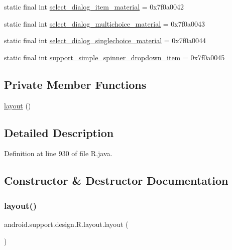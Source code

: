 \begin{DoxyCompactItemize}
static final int \mbox{\hyperlink{classandroid_1_1support_1_1design_1_1_r_1_1layout_aab2090fcba37187805603c08746aa8cc}{select\+\_\+dialog\+\_\+item\+\_\+material}} = 0x7f0a0042
\item 
static final int \mbox{\hyperlink{classandroid_1_1support_1_1design_1_1_r_1_1layout_a3d2eb3f803ab59c599c7022c15479bb8}{select\+\_\+dialog\+\_\+multichoice\+\_\+material}} = 0x7f0a0043
\item 
static final int \mbox{\hyperlink{classandroid_1_1support_1_1design_1_1_r_1_1layout_af908cc6a223fbe33d22bb3088dfc11b2}{select\+\_\+dialog\+\_\+singlechoice\+\_\+material}} = 0x7f0a0044
\item 
static final int \mbox{\hyperlink{classandroid_1_1support_1_1design_1_1_r_1_1layout_a4de293b6e7223138532dd164026cd9c6}{support\+\_\+simple\+\_\+spinner\+\_\+dropdown\+\_\+item}} = 0x7f0a0045
\end{DoxyCompactItemize}
\subsection*{Private Member Functions}
\begin{DoxyCompactItemize}
\item 
\mbox{\hyperlink{classandroid_1_1support_1_1design_1_1_r_1_1layout_a233cc3e001998928e45ff36ce9af8e3e}{layout}} ()
\end{DoxyCompactItemize}


\subsection{Detailed Description}


Definition at line 930 of file R.\+java.



\subsection{Constructor \& Destructor Documentation}
\mbox{\label{classandroid_1_1support_1_1design_1_1_r_1_1layout_a233cc3e001998928e45ff36ce9af8e3e}} 
\subsubsection{\texorpdfstring{layout()}{layout()}}
{\footnotesize\ttfamily android.\+support.\+design.\+R.\+layout.\+layout (\begin{DoxyParamCaption}{ }\end{DoxyParamCaption})\hspace{0.3cm}{\ttfamily [private]}}



